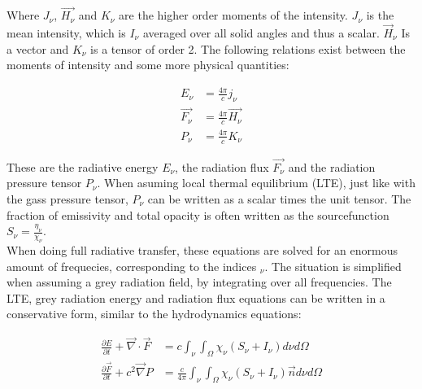Where $J_\nu$, $\vec{H_\nu}$ and $K_\nu$ are the higher order moments of the intensity. $J_\nu$ is the mean intensity, which is $I_\nu$ averaged over all solid angles and thus a scalar. $\vec{H}_\nu$ Is a vector and $K_\nu$ is a tensor of order 2. The following relations exist between the moments of intensity and some more physical quantities:

\begin{align}
E_\nu &= \frac{4 \pi}{c} j_\nu \\
\vec{F_\nu} &= \frac{4 \pi}{c} \vec{H_\nu} \\
P_\nu &= \frac{4 \pi}{c} K_\nu
\end{align}

These are the radiative energy $E_\nu$, the radiation flux $\vec{F_\nu}$ and the radiation pressure tensor $P_\nu$. When asuming local thermal equilibrium (LTE), just like with the gass pressure tensor, $P_\nu$ can be written as a scalar times the unit tensor. The fraction of emissivity and total opacity is often written as the sourcefunction $S_\nu = \frac{\eta_\nu}{\chi_\nu}$. \\
 When doing full radiative transfer, these equations are solved for an enormous amount of frequecies, corresponding to the indices $_\nu$. The situation is simplified when assuming a grey radiation field, by integrating over all frequencies. The LTE, grey radiation energy and radiation flux equations can be written in a conservative form, similar to the hydrodynamics equations:

\begin{align}
\frac{\partial E}{\partial t} + \vec{\nabla} \cdot \vec{F} &= c \int_\nu \int_\Omega \chi_\nu \left( S_\nu + I_\nu \right) d\nu d\Omega \\
\frac{\partial \vec{F}}{\partial t} + c^2 \vec{\nabla} P &= \frac{c}{4 \pi} \int_\nu \int_\Omega \chi_\nu \left( S_\nu + I_\nu \right) \vec{n} d\nu d\Omega
\end{align}


